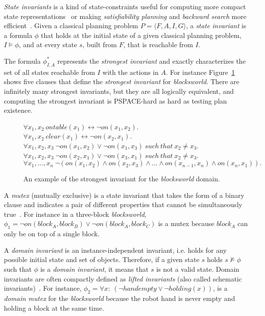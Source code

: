 \documentclass[3p,times]{elsarticle}
\newcommand{\tup}[1]{{\langle #1 \rangle}}
\begin{document}
{\em State invariants} is a kind of state-constraints useful for computing more compact state representations~\cite{helmert2009concise} or making {\em satisfiability planning} and {\em backward search} more efficient~\cite{rintanen2014madagascar,alcazar2015reminder}. Given a classical planning problem $P=\tup{F,A,I,G}$, a {\em state invariant} is a formula $\phi$ that holds at the initial state of a given classical planning problem, $I\models \phi$, and at every state $s$, built from $F$, that is reachable from $I$.

The formula $\phi_{I,A}^*$ represents the {\em strongest invariant} and exactly characterizes the set of all states reachable from $I$ with the actions in $A$. For instance Figure~\ref{fig:strongest-invariant} shows five clauses that define the {\em strongest invariant} for {\em blocksworld}. There are infinitely many strongest invariants, but they are all logically equivalent, and computing the strongest invariant is PSPACE-hard as hard as testing plan existence.

\begin{figure}[hbt!]
  \begin{footnotesize}
    \begin{center}
$\forall x_1,x_2\ ontable(x_1)\leftrightarrow\neg on(x_1,x_2)$.\\
$\forall x_1,x_2\ clear(x_1)\leftrightarrow\neg on(x_2,x_1)$.\\
$\forall x_1,x_2,x_3\ \neg on(x_1,x_2)\vee\neg on(x_1,x_3)\ such\ that\ x_2\neq x_3$.\\
$\forall x_1,x_2,x_3\ \neg on(x_2,x_1)\vee\neg on(x_3,x_1)\ such\ that\ x_2\neq x_3$.\\
$\forall x_1,\ldots,x_n\ \neg(on(x_1,x_2)\wedge on(x_2,x_3)\wedge\ldots\wedge on(x_{n-1},x_n)\wedge on(x_n,x_1)).$ 
    \end{center}
\end{footnotesize}
 \caption{\small An example of the strongest invariant for the {\em blocksworld} domain.}
\label{fig:strongest-invariant}
\end{figure}


A {\em mutex} (mutually exclusive) is a state invariant that takes the form of a binary clause and indicates a pair of different properties that cannot be simultaneously true~\cite{kautz:mutex:IJCAI1999}. For instance in a three-block {\em blocksworld}, $\phi_1=\neg on(block_A,block_B)\vee \neg on(block_A,block_C)$ is a mutex because $block_A$ can only be on top of a single block. 

A {\em domain invariant} is an instance-independent invariant, i.e. holds for any possible initial state and set of objects. Therefore, if a given state $s$ holds $s\nvDash \phi$ such that $\phi$ is a {\em domain invariant}, it means that $s$ is not a valid state. Domain invariants are often compactly defined as {\em lifted invariants} (also called schematic invariants)~\cite{rintanen:schematicInvariants:AAAI2017}. For instance, $\phi_2=\forall x:\ (\neg handempty\vee \neg holding(x))$, is a {\em domain mutex} for the {\em blocksworld} because the robot hand is never empty and holding a block at the same time.
\end{document}
